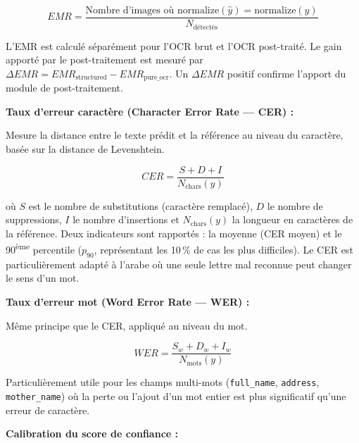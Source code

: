 \begin{tcolorbox}
\begin{equation*}
  EMR = \frac{\text{Nombre d'images où } \mathrm{normalize}(\hat{y}) = \mathrm{normalize}(y)}{N_{\text{détectés}}}
\end{equation*}

\noindent L'EMR est calculé séparément pour l'OCR brut et l'OCR post-traité. Le gain apporté par le post-traitement est mesuré par $\Delta EMR = EMR_{\text{structured}} - EMR_{\text{pure\_ocr}}$. Un $\Delta EMR$ positif confirme l'apport du module de post-traitement.

\medskip

\noindent\textcolor{yolo_header}{}\; \textcolor{yolo_header}{\textbf{Taux d'erreur caractère (Character Error Rate --- CER) :}}

\noindent Mesure la distance entre le texte prédit et la référence au niveau du caractère, basée sur la distance de Levenshtein.

\begin{equation*}
  CER = \frac{S + D + I}{N_{\text{chars}}(y)}
\end{equation*}

\noindent où $S$ est le nombre de substitutions (caractère remplacé), $D$ le nombre de suppressions, $I$ le nombre d'insertions et $N_{\text{chars}}(y)$ la longueur en caractères de la référence. Deux indicateurs sont rapportés : la moyenne (CER moyen) et le 90\textsuperscript{ème} percentile ($p_{90}$, représentant les 10\,\% de cas les plus difficiles). Le CER est particulièrement adapté à l'arabe où une seule lettre mal reconnue peut changer le sens d'un mot.

\medskip

\noindent\textcolor{yolo_header}{}\; \textcolor{yolo_header}{\textbf{Taux d'erreur mot (Word Error Rate --- WER) :}}

\noindent Même principe que le CER, appliqué au niveau du mot.

\begin{equation*}
  WER = \frac{S_w + D_w + I_w}{N_{\text{mots}}(y)}
\end{equation*}

\noindent Particulièrement utile pour les champs multi-mots (\texttt{full\_name}, \texttt{address}, \texttt{mother\_name}) où la perte ou l'ajout d'un mot entier est plus significatif qu'une erreur de caractère.

\medskip

\noindent\textcolor{yolo_header}{}\; \textcolor{yolo_header}{\textbf{Calibration du score de confiance :}}


\end{tcolorbox}
